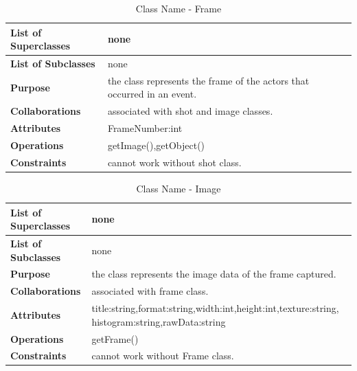 \documentclass[12pt]{article}
\begin{document}
\begin{table}[h!]
\caption{Class Name - Frame}
\label{tab:my-table}
\begin{tabular}{|p{}|p{}|}


 \hline
\textbf{List of Superclasses}  &    none                                             
\\ \hline
\textbf{List of Subclasses}    & none                                                                 
\\ \hline
\textbf{Purpose}               & the class represents the frame of the actors that occurred in an event. 
\\ \hline
\textbf{Collaborations}        & associated with shot and image classes. 
\\ \hline
\textbf{Attributes}  & FrameNumber:int
\\ \hline
\textbf{Operations} & getImage(),getObject()
\\ \hline
\textbf{Constraints} & cannot work without shot class.
\\ \hline
\end{tabular}
\end{table}


\begin{table}[h!]
\caption{Class Name - Image}
\label{tab:my-table}
\begin{tabular}{|p{}|p{}|}


 \hline
\textbf{List of Superclasses}  &    none                                             
\\ \hline
\textbf{List of Subclasses}    & none                                                                 
\\ \hline
\textbf{Purpose}               & the class represents the image data of the frame captured.
\\ \hline
\textbf{Collaborations}        & associated with frame class. 
\\ \hline
\textbf{Attributes}  & title:string,format:string,width:int,height:int,texture:string,
histogram:string,rawData:string
\\ \hline
\textbf{Operations} & getFrame()
\\ \hline
\textbf{Constraints} & cannot work without Frame class.
\\ \hline
\end{tabular}
\end{table}


 \FloatBarrier
\end{document}
